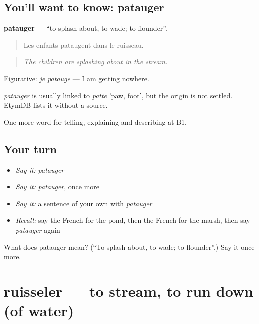 \subsection*{You'll want to know: patauger}
\textbf{patauger} — \textquotedblleft{}to splash about, to wade; to flounder\textquotedblright{}.

\begin{quote}
Les enfants pataugent dans le ruisseau.
\end{quote}

\begin{quote}
\emph{The children are splashing about in the stream.}
\end{quote}

Figurative: \emph{je patauge} — I am getting nowhere.

\begin{cousinweb}
\emph{patauger} is usually linked to \emph{patte} 'paw, foot', but the origin is not settled. EtymDB lists it without a source.
\end{cousinweb}

\begin{grammarlens}[title={What you've built}]
One more word for telling, explaining and describing at B1.
\end{grammarlens}

\subsection*{Your turn}
\begin{itemize}
\raggedright
  \item \emph{Say it:} \emph{patauger}
  \item \emph{Say it:} \emph{patauger}, once more
  \item \emph{Say it:} a sentence of your own with \emph{patauger}
  \item \emph{Recall:} say the French for the pond, then the French for the marsh, then say \emph{patauger} again
\end{itemize}

\begin{tcolorbox}[breakable,colback=teal!4,colframe=teal!35!black,title={Before you move on}]
What does patauger mean? (\textquotedblleft{}To splash about, to wade; to flounder\textquotedblright{}.) Say it once more.
\end{tcolorbox}
\section[ruisseler]{ruisseler — to stream, to run down (of water)}

